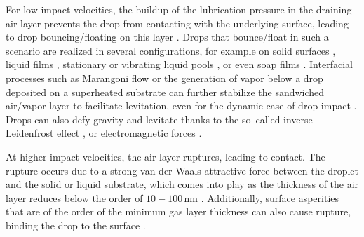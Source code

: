 \documentclass[]{jfm}
\begin{document}
	For low impact velocities, the buildup of the lubrication pressure in the draining air layer prevents the drop from contacting with the underlying surface, leading to drop bouncing/floating on this layer \citep{reynolds1881floating,davis1989lubrication, yiantsios1990buoyancy, yiantsios1991close, smith2003air, van2012direct}. Drops that bounce/float in such a scenario are realized in several configurations, for example on solid surfaces \citep{kolinski2014drops, de2015wettability}, liquid films \citep{pan2007dynamics, hao2015superhydrophobic, tang2018bouncing, tang2019bouncing}, stationary \citep{rodriguez1985some, klyuzhin2010persisting, wu2020small} or vibrating liquid pools \citep{couder2005bouncing, couder2005walking}, or even soap films \citep{gilet2009fluid}. 
	Interfacial processes such as Marangoni flow \citep{geri2017thermal} or the generation of vapor below a drop deposited on a superheated substrate \citep[the Leidenfrost effect where the liquid levitates on a cushion of its own vapor,][]{leidenfrost1756,quere2013leidenfrost, chantelot2021leidenfrost} can further stabilize the sandwiched air/vapor layer to facilitate levitation, even for the dynamic case of drop impact \citep{chandra1991collision,tran2012drop,shirota2016dynamic}. Drops can also defy gravity and levitate thanks to the so--called inverse Leidenfrost effect \citep{adda2016inverse, gauthier2019self}, or electromagnetic forces \citep{pal2017control, singh2018levitation}. 
	
	At higher impact velocities, the air layer ruptures, leading to contact. The rupture occurs due to a strong van der Waals attractive force between the droplet and the solid or liquid substrate, which comes into play as the thickness of the air layer reduces below the order of $10 - 100\,\si{\nano\meter}$ \citep[see appendix~\ref{App:FilmRupture}, and][]{charles1960coalescence, SprittlesPhysRevLett.124.084501, zhang2021thin}. Additionally, surface asperities that are of the order of the minimum gas layer thickness can also cause rupture, binding the drop to the surface \citep{thoroddsen2003air, kolinski2014drops, li_vakarelski_thoroddsen_2015}. 
	
\end{document}
